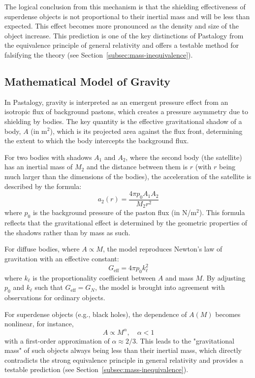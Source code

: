\documentclass[pdflatex,sn-mathphys-num,referee]{sn-jnl}
\begin{document}
The logical conclusion from this mechanism is that the shielding effectiveness of superdense objects is not proportional to their inertial mass and will be less than expected. This effect becomes more pronounced as the density and size of the object increase. This prediction is one of the key distinctions of Pastalogy from the equivalence principle of general relativity and offers a testable method for falsifying the theory (see Section~\ref{subsec:mass-inequivalence}).

\subsection{Mathematical Model of Gravity}\label{subsec:gravity-model}

In Pastalogy, gravity is interpreted as an emergent pressure effect from an isotropic flux of background pastons, which creates a pressure asymmetry due to shielding by bodies. The key quantity is the effective gravitational shadow of a body, \( A \) (in m\(^2\)), which is its projected area against the flux front, determining the extent to which the body intercepts the background flux.

For two bodies with shadows \( A_1 \) and \( A_2 \), where the second body (the satellite) has an inertial mass of \( M_2 \) and the distance between them is \( r \) (with \( r \) being much larger than the dimensions of the bodies), the acceleration of the satellite is described by the formula:
\[
a_2(r) = \frac{4\pi p_0 A_1 A_2}{M_2 r^2}
\]
where \( p_0 \) is the background pressure of the paston flux (in N/m\(^2\)). This formula reflects that the gravitational effect is determined by the geometric properties of the shadows rather than by mass as such.

For diffuse bodies, where \( A \propto M \), the model reproduces Newton's law of gravitation \cite{newton1687-principia, halliday2013-fundamentals} with an effective constant:
\[
G_{\text{eff}} = 4\pi p_0 k_\ell^2
\]
where \( k_\ell \) is the proportionality coefficient between \( A \) and mass \( M \). By adjusting \( p_0 \) and \( k_\ell \) such that \( G_{\text{eff}} = G_N \), the model is brought into agreement with observations for ordinary objects.

For superdense objects (e.g., black holes), the dependence of \( A(M) \) becomes nonlinear, for instance,
\[
A \propto M^\alpha, \quad \alpha < 1
\]
with a first-order approximation of \( \alpha \approx 2/3 \). This leads to the "gravitational mass" of such objects always being less than their inertial mass, which directly contradicts the strong equivalence principle in general relativity and provides a testable prediction (see Section~\ref{subsec:mass-inequivalence}).
\end{document}
